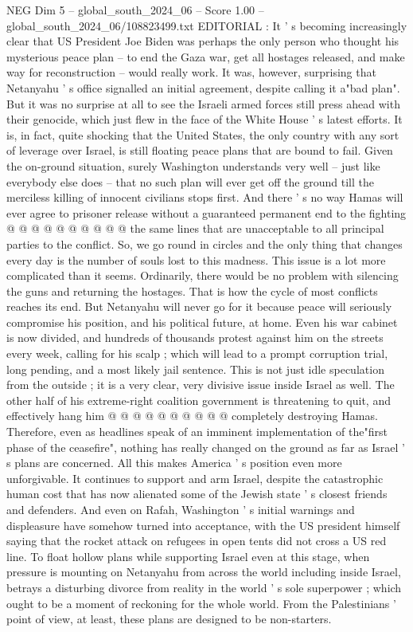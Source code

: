 \begin{textsample}{NEG Dim 5 – global\_south\_2024\_06 – Score 1.00 – global\_south\_2024\_06/108823499.txt}  \label{ex:f5_neg_238}
EDITORIAL : It ' s becoming increasingly clear that US President Joe Biden was perhaps the only person who thought his mysterious peace plan -- to end the Gaza war, get all hostages released, and make way for reconstruction -- would really work.
It was, however, surprising that Netanyahu ' s office signalled an initial agreement, despite calling it a"bad plan".
But it was no surprise at all to see the Israeli armed forces still press ahead with their genocide, which just flew in the face of the White House ' s latest efforts.
It is, in fact, quite shocking that the United States, the only country with any sort of leverage over Israel, is still floating peace plans that are bound to fail.
Given the on-ground situation, surely Washington understands very well -- just like everybody else does -- that no such plan will ever get off the ground till the merciless killing of innocent civilians stops first.
And there ' s no way Hamas will ever agree to prisoner release without a guaranteed permanent end to the fighting @ @ @ @ @ @ @ @ @ @ the same lines that are unacceptable to all principal parties to the conflict.
So, we go round in circles and the only thing that changes every day is the number of souls lost to this madness.
This issue is a lot more complicated than it seems.
Ordinarily, there would be no problem with silencing the guns and returning the hostages.
That is how the cycle of most conflicts reaches its end.
But Netanyahu will never go for it because peace will seriously compromise his position, and his political future, at home.
Even his war cabinet is now divided, and hundreds of thousands protest against him on the streets every week, calling for his scalp ; which will lead to a prompt corruption trial, long pending, and a most likely jail sentence.
This is not just idle speculation from the outside ; it is a very clear, very divisive issue inside Israel as well.
The other half of his extreme-right coalition government is threatening to quit, and effectively hang him @ @ @ @ @ @ @ @ @ @ completely destroying Hamas.
Therefore, even as headlines speak of an imminent implementation of the"first phase of the ceasefire", nothing has really changed on the ground as far as Israel ' s plans are concerned.
All this makes America ' s position even more unforgivable.
It continues to support and arm Israel, despite the catastrophic human cost that has now alienated some of the Jewish state ' s closest friends and defenders.
And even on Rafah, Washington ' s initial warnings and displeasure have somehow turned into acceptance, with the US president himself saying that the rocket attack on refugees in open tents did not cross a US red line.
To float hollow plans while supporting Israel even at this stage, when pressure is mounting on Netanyahu from across the world including inside Israel, betrays a disturbing divorce from reality in the world ' s sole superpower ; which ought to be a moment of reckoning for the whole world.
From the Palestinians ' point of view, at least, these plans are designed to be non-starters.

\end{textsample}
